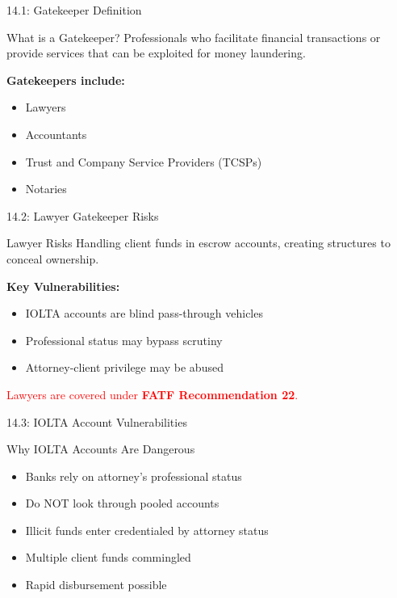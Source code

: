 \documentclass{beamer}
\begin{document}
	
	\begin{frame}{14.1: Gatekeeper Definition}
		\begin{block}{What is a Gatekeeper?}
			Professionals who facilitate financial transactions or provide services that can be exploited for money laundering.
		\end{block}
		\textbf{Gatekeepers include:}
		\begin{itemize}
			\item Lawyers
			\item Accountants
			\item Trust and Company Service Providers (TCSPs)
			\item Notaries
		\end{itemize}
	\end{frame}
	
	\begin{frame}{14.2: Lawyer Gatekeeper Risks}
		\begin{block}{Lawyer Risks}
			Handling client funds in escrow accounts, creating structures to conceal ownership.
		\end{block}
		\textbf{Key Vulnerabilities:}
		\begin{itemize}
			\item IOLTA accounts are blind pass-through vehicles
			\item Professional status may bypass scrutiny
			\item Attorney-client privilege may be abused
		\end{itemize}
		\textcolor{red}{Lawyers are covered under \textbf{FATF Recommendation 22}.}
	\end{frame}
	
	\begin{frame}{14.3: IOLTA Account Vulnerabilities}
		\begin{block}{Why IOLTA Accounts Are Dangerous}
			\begin{itemize}
				\item Banks rely on attorney's professional status
				\item Do NOT look through pooled accounts
				\item Illicit funds enter credentialed by attorney status
				\item Multiple client funds commingled
				\item Rapid disbursement possible
			\end{itemize}
		\end{block}
	\end{frame}
	
\end{document}
